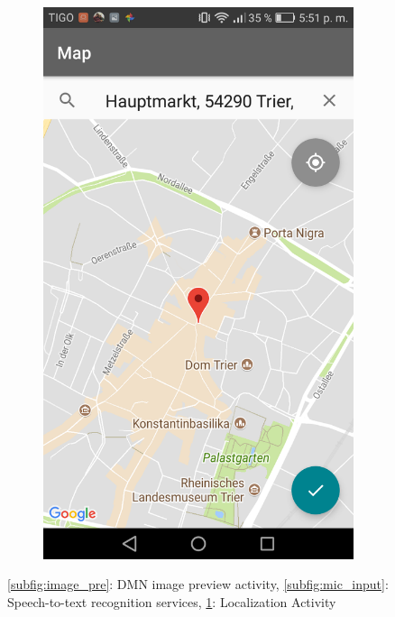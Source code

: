 \begin{figure}[!htbp]
\begin{multicols}{3}
    \begin{subfigure}[b]{\columnwidth}
            \centering
            \includegraphics[width=\textwidth]{./figures/dmn_app/views/5.png}
    \label{subfig:loc}
    \end{subfigure}
    \end{multicols}
    
    \caption{\ref{subfig:image_pre}: DMN image preview activity, \ref{subfig:mic_input}: Speech-to-text recognition services, \ref{subfig:loc}: Localization Activity}
    \label{Fig:Img_Pre}
\end{figure}

